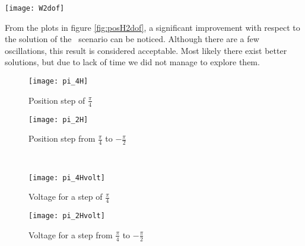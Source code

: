 \begin{figure*}[h]
	\centering
	\texttt{[image: W2dof]}
	\caption{Weighting functions}
\end{figure*}


From the plots in figure \ref{fig:posH2dof}, a significant improvement with respect to the solution of the \onedof\ scenario can be noticed. Although there are a few oscillations, this result is considered acceptable. Most likely there exist better solutions, but due to lack of time we did not manage to explore them.

 \begin{figure*}[h]
	\centering
	\begin{subfigure}{0.5\columnwidth}
		\texttt{[image: pi\_4H]}
		\caption{Position step of $\frac{\pi}{4}$}
	\end{subfigure}
	\begin{subfigure}{0.45\columnwidth}
		\texttt{[image: pi\_2H]}
		\caption{Position step from $\frac{\pi}{4}$ to $-\frac{\pi}{2}$}
	\end{subfigure}
	\\
	\begin{subfigure}{0.5\columnwidth}
		\texttt{[image: pi\_4Hvolt]}
		\caption{Voltage for a step of $\frac{\pi}{4}$}
	\end{subfigure}
	\begin{subfigure}{0.45\columnwidth}
		\texttt{[image: pi\_2Hvolt]}
		\caption{Voltage for a step from $\frac{\pi}{4}$ to $-\frac{\pi}{2}$}
	\end{subfigure}
	\caption{Position steps response}
	\label{fig:posH2dof}
\end{figure*}




 


